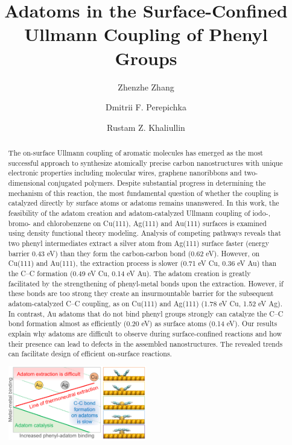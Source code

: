 \documentclass[aps,prb,amsmath,amssymb,11pt]{revtex4-1}
\begin{document}
\title
{Adatoms in the Surface-Confined Ullmann Coupling of Phenyl Groups}

\author{Zhenzhe Zhang}
\author{Dmitrii F. Perepichka}%
\author{Rustam Z. Khaliullin}
%

\begin{abstract}
The on-surface Ullmann coupling of aromatic molecules has emerged as the most successful approach to synthesize atomically precise carbon nanostructures with unique electronic properties including molecular wires, graphene nanoribbons and two-dimensional conjugated polymers. Despite substantial progress in determining the mechanism of this reaction, the most fundamental question of whether the coupling is catalyzed directly by surface atoms or adatoms remains unanswered. In this work, the feasibility of the adatom creation and adatom-catalyzed Ullmann coupling of  iodo-, bromo- and chlorobenzene on Cu(111), Ag(111) and Au(111) surfaces is examined using density functional theory modeling. Analysis of competing pathways reveals that two phenyl intermediates extract a silver atom from Ag(111) surface faster (energy barrier 0.43 eV) than they form the carbon-carbon bond (0.62 eV). However, on Cu(111) and Au(111), the extraction process is slower (0.71 eV Cu, 0.36 eV Au) than the C--C formation (0.49 eV Cu, 0.14 eV Au). The adatom creation is greatly facilitated by the strengthening of phenyl-metal bonds upon the extraction. However, if these bonds are too strong they create an insurmountable barrier for the subsequent adatom-catalyzed C--C coupling, as on Cu(111) and Ag(111) (1.78 eV Cu, 1.52 eV Ag). In contrast, Au adatoms that do not bind phenyl groups strongly can catalyze the C--C bond formation almost as efficiently (0.20 eV) as surface atoms (0.14 eV). Our results explain why adatoms are difficult to observe during surface-confined reactions and how their presence can lead to defects in the assembled nanostructures. The revealed trends can facilitate design of efficient on-surface reactions.

\begin{center}
\includegraphics[width=0.50\textwidth]{TOG/TOG-main.pdf}
\end{center}

\end{abstract}
\end{document}
